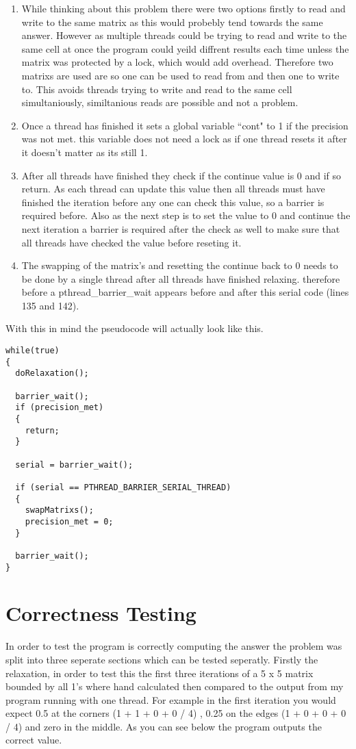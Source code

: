\documentclass{article}
\begin{document}
\begin{enumerate}
\item While thinking about this problem there were two options firstly to read and write
to the same matrix as this would probebly tend towards the same answer. However
as multiple threads could be trying to read and write to the same cell at once the
program could yeild diffrent results each time unless the matrix was protected by a lock, which would add
overhead.
Therefore two matrixs are used are so one can be used to read from
and then one to write to. This avoids threads trying to write and read to the same cell simultaniously,
similtanious reads are possible and not a problem.\\
\item Once a thread has finished it sets a global variable ``cont" to 1 if the
precision was not met. this variable does not need a lock as if one thread resets
it after it doesn't matter as its still 1.
\item After all threads have finished they check if the continue value is 0 and if
so return. As each thread can update this value then all threads must have finished
the iteration before any one can check this value, so a barrier is required before.
Also as the next step is to set the value to 0 and continue the next iteration a barrier
is required after the check as well to make sure that all threads have checked the value
before reseting it.
\item The swapping of the matrix's and resetting the continue back to 0 needs to be
done by a single thread after all threads have finished relaxing. therefore before a
pthread\_barrier\_wait appears before and after this serial code (lines 135 and 142).
\end{enumerate}

With this in mind the pseudocode will actually look like this.\\

\begin{lstlisting}
while(true)
{
  doRelaxation();

  barrier_wait();
  if (precision_met)
  {
    return;
  }

  serial = barrier_wait();

  if (serial == PTHREAD_BARRIER_SERIAL_THREAD)
  {
    swapMatrixs();
    precision_met = 0;
  }

  barrier_wait();
}
\end{lstlisting}

\newpage
\section{Correctness Testing}
In order to test the program is correctly computing the answer the problem was split
into three seperate sections which can be tested seperatly. Firstly the relaxation,
in order to test this the first three iterations of a 5 x 5 matrix bounded by all 1's
where hand calculated then compared to the output from my program running with one
thread. For example in the first iteration you would expect 0.5 at the corners (1 + 1 + 0 + 0 / 4)
, 0.25 on the edges (1 + 0 + 0 + 0 / 4) and zero in the middle. As you can see below the program outputs the correct
value.
\end{document}
